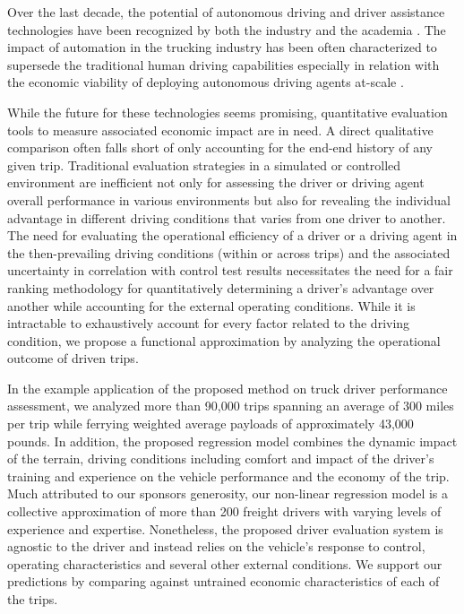 \documentclass{article}
\begin{document}
Over the last decade, the potential of autonomous driving and driver assistance technologies have been recognized by both the industry and the academia \cite{paden2016survey}. The impact of automation in the trucking industry has been often characterized to supersede the traditional human driving capabilities especially in relation with the economic viability of deploying autonomous driving agents at-scale \cite{costello2017truck}.

While the future for these technologies seems promising, quantitative evaluation tools to measure associated economic impact are in need. A direct qualitative comparison often falls short of only accounting for the end-end history of any given trip. Traditional evaluation strategies in a simulated or controlled environment are inefficient not only for assessing the driver or driving agent overall performance in various environments \cite{jeong2006functional, lappi2015racer} but also for revealing the individual advantage in different driving conditions that varies from one driver to another. The need for evaluating the operational efficiency of a driver or a driving agent in the then-prevailing driving conditions (within or across trips) and the associated uncertainty in correlation with control test results necessitates the need for a fair ranking methodology for quantitatively determining a driver's advantage over another while accounting for the external operating conditions. While it is intractable to exhaustively account for every factor related to the driving condition, we propose a functional approximation by analyzing the operational outcome of driven trips.

In the example application of the proposed method on truck driver performance assessment, we analyzed more than 90,000 trips spanning an average of 300 miles per trip while ferrying weighted average payloads of approximately 43,000 pounds. In addition, the proposed regression model combines the dynamic impact of the terrain, driving conditions including comfort and impact of the driver's training and experience on the vehicle performance and the economy of the trip. Much attributed to our sponsors generosity, our non-linear regression model is a collective approximation of more than 200 freight drivers with varying levels of experience and expertise. Nonetheless, the proposed driver evaluation system is agnostic to the driver and instead relies on the vehicle's response to control, operating characteristics and several other external conditions. We support our predictions by comparing against untrained economic characteristics of each of the trips.
\end{document}
